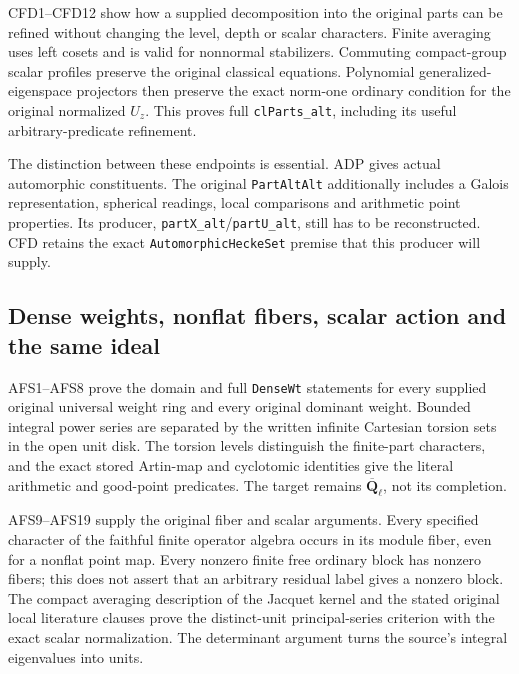 CFD1--CFD12 show how a supplied decomposition into the original parts
can be refined without changing the level, depth or scalar characters.
Finite averaging uses left cosets and is valid for nonnormal
stabilizers. Commuting compact-group scalar profiles preserve the
original classical equations. Polynomial generalized-eigenspace
projectors then preserve the exact norm-one ordinary condition for
the original normalized $U_z$. This proves full \texttt{cl\allowbreak Parts\_\allowbreak alt},
including its useful arbitrary-predicate refinement.

The distinction between these endpoints is essential. ADP gives
actual automorphic constituents. The original \texttt{Part\allowbreak Alt\allowbreak Alt}
additionally includes a Galois representation, spherical readings,
local comparisons and arithmetic point properties. Its producer,
\texttt{part\allowbreak X\_\allowbreak alt}/\texttt{part\allowbreak U\_\allowbreak alt}, still has to be reconstructed.
CFD retains the exact \texttt{Automorphic\allowbreak Hecke\allowbreak Set} premise that this
producer will supply.

\subsection{Dense weights, nonflat fibers, scalar action and the same ideal}

AFS1--AFS8 prove the domain and full \texttt{Dense\allowbreak Wt} statements for
every supplied original universal weight ring and every original
dominant weight. Bounded integral power series are separated by the
written infinite Cartesian torsion sets in the open unit disk. The
torsion levels distinguish the finite-part characters, and the exact
stored Artin-map and cyclotomic identities give the literal arithmetic
and good-point predicates. The target remains
$\overline{\mathbf Q}_\ell$, not its completion.

AFS9--AFS19 supply the original fiber and scalar arguments. Every
specified character of the faithful finite operator algebra occurs
in its module fiber, even for a nonflat point map. Every nonzero
finite free ordinary block has nonzero fibers; this does not assert
that an arbitrary residual label gives a nonzero block. The compact
averaging description of the Jacquet kernel and the stated original
local literature clauses prove the distinct-unit principal-series
criterion with the exact scalar normalization. The determinant
argument turns the source's integral eigenvalues into units.

